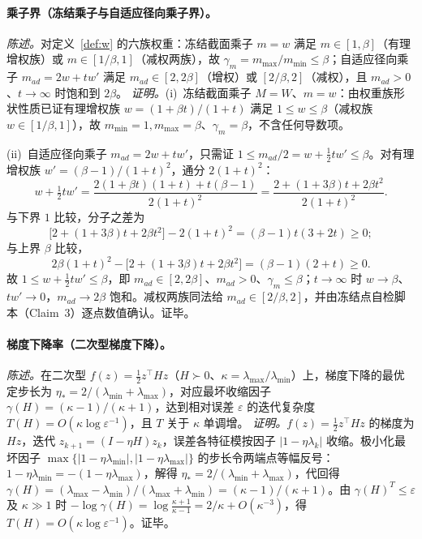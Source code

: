 \documentclass[fontset=windows,11pt]{ctexart}
\newcommand{\W}{W}
\numberwithin{equation}{section}
\begin{document}
\paragraph{乘子界（冻结乘子与自适应径向乘子界）。}
\emph{陈述。}对定义~\ref{def:w} 的六族权重：冻结截面乘子 $m=w$ 满足 $m\in[1,\beta]$（有理增权族）或 $m\in[1/\beta,1]$（减权两族），故 $\gamma_m=m_{\max}/m_{\min}\le\beta$；自适应径向乘子 $m_{ad}=2w+tw'$ 满足 $m_{ad}\in[2,2\beta]$（增权）或 $[2/\beta,2]$（减权），且 $m_{ad}>0$、$t\to\infty$ 时饱和到 $2\beta$。
\emph{证明。}(i)~冻结截面乘子 $M=\W$、$m=w$：由权重族形状性质已证有理增权族 $w=(1+\beta t)/(1+t)$ 满足 $1\le w\le\beta$（减权族 $w\in[1/\beta,1]$），故 $m_{\min}=1,m_{\max}=\beta$、$\gamma_m=\beta$，不含任何导数项。
\par\noindent(ii)~自适应径向乘子 $m_{ad}=2w+tw'$，只需证 $1\le m_{ad}/2=w+\tfrac12tw'\le\beta$。对有理增权族 $w'=(\beta-1)/(1+t)^2$，通分 $2(1+t)^2$：
\[
w+\tfrac12tw'=\frac{2(1+\beta t)(1+t)+t(\beta-1)}{2(1+t)^2}
=\frac{2+(1+3\beta)t+2\beta t^2}{2(1+t)^2}.
\]
与下界 $1$ 比较，分子之差为
\[
\bigl[2+(1+3\beta)t+2\beta t^2\bigr]-2(1+t)^2=(\beta-1)t(3+2t)\ge0;
\]
与上界 $\beta$ 比较，
\[
2\beta(1+t)^2-\bigl[2+(1+3\beta)t+2\beta t^2\bigr]=(\beta-1)(2+t)\ge0.
\]
故 $1\le w+\tfrac12tw'\le\beta$，即 $m_{ad}\in[2,2\beta]$、$m_{ad}>0$、$\gamma_m\le\beta$；$t\to\infty$ 时 $w\to\beta$、$tw'\to0$，$m_{ad}\to2\beta$ 饱和。减权两族同法给 $m_{ad}\in[2/\beta,2]$，并由冻结点自检脚本（Claim~3）逐点数值确认。证毕。

\paragraph{梯度下降率（二次型梯度下降）。}
\emph{陈述。}在二次型 $f(z)=\tfrac12z^\top Hz$（$H\succ0$、$\kappa=\lambda_{\max}/\lambda_{\min}$）上，梯度下降的最优定步长为 $\eta_*=2/(\lambda_{\min}+\lambda_{\max})$，对应最坏收缩因子 $\gamma(H)=(\kappa-1)/(\kappa+1)$，达到相对误差 $\varepsilon$ 的迭代复杂度 $T(H)=O(\kappa\log\varepsilon^{-1})$，且 $T$ 关于 $\kappa$ 单调增。
\emph{证明。}$f(z)=\tfrac12z^\top Hz$ 的梯度为 $Hz$，迭代 $z_{k+1}=(I-\eta H)z_k$，误差各特征模按因子 $|1-\eta\lambda_k|$ 收缩。极小化最坏因子 $\max\{|1-\eta\lambda_{\min}|,|1-\eta\lambda_{\max}|\}$ 的步长令两端点等幅反号：$1-\eta\lambda_{\min}=- (1-\eta\lambda_{\max})$，解得 $\eta_*=2/(\lambda_{\min}+\lambda_{\max})$，代回得 $\gamma(H)=(\lambda_{\max}-\lambda_{\min})/(\lambda_{\max}+\lambda_{\min})=(\kappa-1)/(\kappa+1)$。由 $\gamma(H)^T\le\varepsilon$ 及 $\kappa\gg1$ 时 $-\log\gamma(H)=\log\frac{\kappa+1}{\kappa-1}=2/\kappa+O(\kappa^{-3})$，得 $T(H)=O(\kappa\log\varepsilon^{-1})$。证毕。
\end{document}
